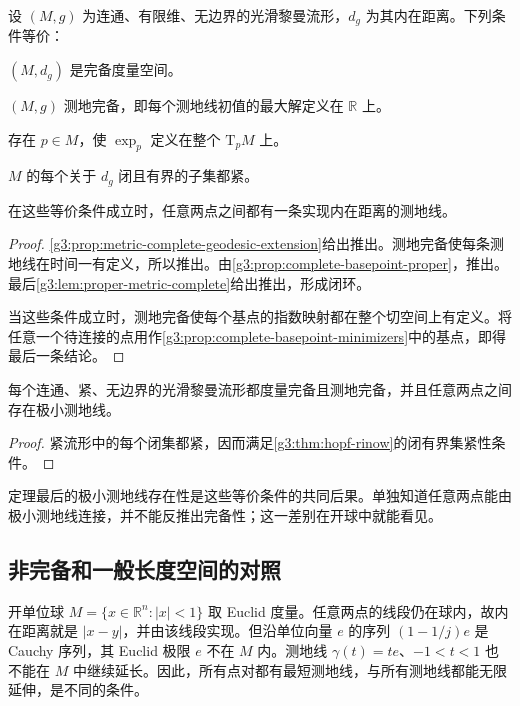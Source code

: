 \begin{theorem}\label{g3:thm:hopf-rinow}
	设 \((M,g)\) 为连通、有限维、无边界的光滑黎曼流形，\(d_g\) 为其内在距离。下列条件等价：
	\begin{equivalences}
		\item \label{g3:item:hr-metric-complete}\((M,d_g)\) 是完备度量空间。
		\item \label{g3:item:hr-geodesic-complete}\((M,g)\) 测地完备，即每个测地线初值的最大解定义在 \(\mathbb R\) 上。
		\item \label{g3:item:hr-basepoint-complete}存在 \(p\in M\)，使 \(\exp_p\) 定义在整个 \(\mathrm T_pM\) 上。
		\item \label{g3:item:hr-closed-bounded-compact}\(M\) 的每个关于 \(d_g\) 闭且有界的子集都紧。
	\end{equivalences}
	在这些等价条件成立时，任意两点之间都有一条实现内在距离的测地线。
\end{theorem}
\begin{proof}
	\cref{g3:prop:metric-complete-geodesic-extension}给出推出。测地完备使每条测地线在时间一有定义，所以推出。由\cref{g3:prop:complete-basepoint-proper}，推出。最后\cref{g3:lem:proper-metric-complete}给出推出，形成闭环。

	当这些条件成立时，测地完备使每个基点的指数映射都在整个切空间上有定义。将任意一个待连接的点用作\cref{g3:prop:complete-basepoint-minimizers}中的基点，即得最后一条结论。
\end{proof}

\begin{corollary}\label{g3:cor:compact-riemannian-complete}
	每个连通、紧、无边界的光滑黎曼流形都度量完备且测地完备，并且任意两点之间存在极小测地线。
\end{corollary}
\begin{proof}
	紧流形中的每个闭集都紧，因而满足\cref{g3:thm:hopf-rinow}的闭有界集紧性条件。
\end{proof}

定理最后的极小测地线存在性是这些等价条件的共同后果。单独知道任意两点能由极小测地线连接，并不能反推出完备性；这一差别在开球中就能看见。

\subsection{非完备和一般长度空间的对照}
\label{g3:subsec:0203:05}
\begin{example}\label{g3:exm:convex-open-ball-incomplete}
	开单位球 \(M=\{x\in\mathbb R^n:|x|<1\}\) 取 Euclid 度量。任意两点的线段仍在球内，故内在距离就是 \(|x-y|\)，并由该线段实现。但沿单位向量 \(e\) 的序列 \((1-1/j)e\) 是 Cauchy 序列，其 Euclid 极限 \(e\) 不在 \(M\) 内。测地线 \(\gamma(t)=te\)、\(-1<t<1\) 也不能在 \(M\) 中继续延长。因此，所有点对都有最短测地线，与所有测地线都能无限延伸，是不同的条件。
\end{example}

